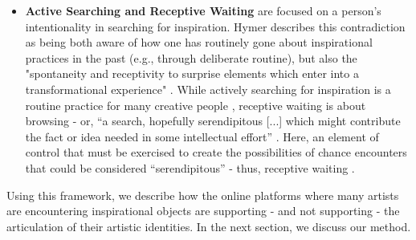 \begin{itemize}
\item \textbf{Active Searching and Receptive Waiting} are focused on a person's intentionality in searching for inspiration. Hymer describes this contradiction as being both aware of how one has routinely gone about inspirational practices in the past (e.g., through deliberate routine), but also the "spontaneity and receptivity to surprise elements which enter into a transformational experience" \cite[~p.31]{hymer1990inspiration}. While actively searching for inspiration is a routine practice for many creative people \cite{hill2016searching}, receptive waiting is about browsing - or, “a search, hopefully serendipitous [...] which might contribute the fact or idea needed in some intellectual effort” \cite[~p.4]{morse1970browsing}. Here, an element of control that must be exercised to create the possibilities of chance encounters that could be considered “serendipitous” - thus, receptive waiting  \cite{rice2001accessing, foster2003serendipity}.

\end{itemize}

    Using this framework, we describe how the online platforms where many artists are encountering inspirational objects are supporting - and not supporting - the articulation of their artistic identities. In the next section, we discuss our method. \par